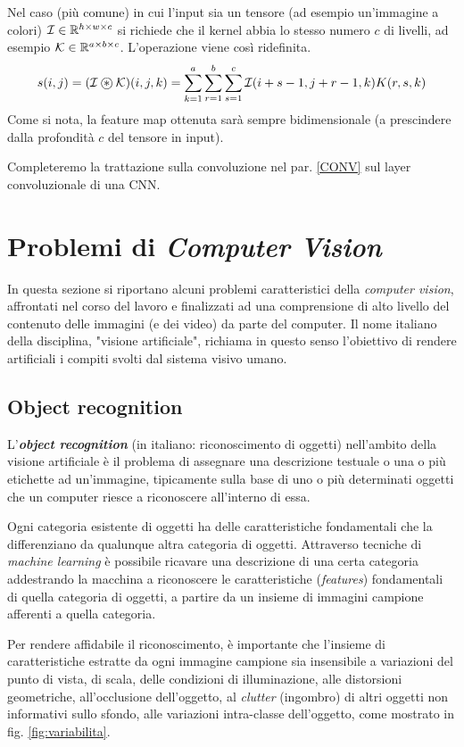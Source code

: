 Nel caso (più comune) in cui l’input sia un tensore (ad esempio un’immagine a colori) $\mathcal{I}\in\mathbb{R}^{h\times w\times c}$ si richiede che il kernel abbia lo stesso numero $c$ di livelli, ad esempio $\mathcal{K}\in\mathbb{R}^{a\times b\times c}$. L'operazione viene così ridefinita.
\begin{equation*}
s(i,j)=(\mathcal{I}\oast\mathcal{K})(i,j,k)=\sum_{k=1}^a\sum_{r=1}^b\sum_{s=1}^c\mathcal{I}(i+s-1,j+r-1,k)K(r,s,k)
\end{equation*}
Come si nota, la feature map ottenuta sarà sempre bidimensionale (a prescindere dalla profondità $c$ del tensore in input).

Completeremo la trattazione sulla convoluzione nel par. \ref{CONV} sul layer convoluzionale di una CNN.

\section{Problemi di \textit{Computer Vision}}
\label{computerVision}
In questa sezione si riportano alcuni problemi caratteristici della \textit{computer vision}, affrontati nel corso del lavoro e finalizzati ad una comprensione di alto livello del contenuto delle immagini (e dei video) da parte del computer. Il nome italiano della disciplina, "visione artificiale", richiama in questo senso l'obiettivo di rendere artificiali i compiti svolti dal sistema visivo umano.

\subsection{Object recognition}
\label{objectRecognition}
L'\textbf{\textit{object recognition}} (in italiano: riconoscimento di oggetti) nell'ambito della visione artificiale è il problema di assegnare una descrizione testuale o una o più etichette ad un'immagine, tipicamente sulla base di uno o più determinati oggetti che un computer riesce a riconoscere all'interno di essa.

Ogni categoria esistente di oggetti ha delle caratteristiche fondamentali che la differenziano da qualunque altra categoria di oggetti. Attraverso tecniche di \textit{machine learning} è possibile ricavare una descrizione di una certa categoria addestrando la macchina a riconoscere le caratteristiche (\textit{features}) fondamentali di quella categoria di oggetti, a partire da un insieme di immagini campione afferenti a quella categoria.

Per rendere affidabile il riconoscimento, è importante che l'insieme di caratteristiche estratte da ogni immagine campione sia insensibile a variazioni del punto di vista, di scala, delle condizioni di illuminazione, alle distorsioni geometriche, all'occlusione dell'oggetto, al \textit{clutter} (ingombro) di altri oggetti non informativi sullo sfondo, alle variazioni intra-classe dell'oggetto, come mostrato in fig. \ref{fig:variabilita}.


